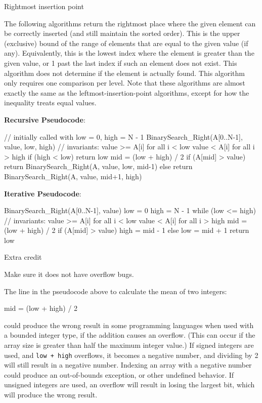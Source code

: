 Rightmost insertion point

The following algorithms return the rightmost place where the given
element can be correctly inserted (and still maintain the sorted order).
This is the upper (exclusive) bound of the range of elements that are
equal to the given value (if any). Equivalently, this is the lowest
index where the element is greater than the given value, or 1 past the
last index if such an element does not exist. This algorithm does not
determine if the element is actually found. This algorithm only requires
one comparison per level. Note that these algorithms are almost exactly
the same as the leftmost-insertion-point algorithms, except for how the
inequality treats equal values.

\textbf{Recursive Pseudocode}:

\begin{wideverbatim}
  // initially called with low = 0, high = N - 1
  BinarySearch_Right(A[0..N-1], value, low, high) {
      // invariants: value >= A[i] for all i < low
                     value < A[i] for all i > high
      if (high < low)
          return low
      mid = (low + high) / 2
      if (A[mid] > value)
          return BinarySearch_Right(A, value, low, mid-1)
      else
          return BinarySearch_Right(A, value, mid+1, high)
  }
\end{wideverbatim}

\textbf{Iterative Pseudocode}:

\begin{wideverbatim}
  BinarySearch_Right(A[0..N-1], value) {
      low = 0
      high = N - 1
      while (low <= high) {
          // invariants: value >= A[i] for all i < low
                         value < A[i] for all i > high
          mid = (low + high) / 2
          if (A[mid] > value)
              high = mid - 1
          else
              low = mid + 1
      }
      return low
  }
\end{wideverbatim}

Extra credit

Make sure it does not have overflow bugs.

The line in the pseudocode above to calculate the mean of two integers:

\begin{wideverbatim}
mid = (low + high) / 2
\end{wideverbatim}

could produce the wrong result in some programming languages when used
with a bounded integer type, if the addition causes an overflow. (This
can occur if the array size is greater than half the maximum integer
value.) If signed integers are used, and \texttt{low + high} overflows,
it becomes a negative number, and dividing by 2 will still result in a
negative number. Indexing an array with a negative number could produce
an out-of-bounds exception, or other undefined behavior. If unsigned
integers are used, an overflow will result in losing the largest bit,
which will produce the wrong result.

